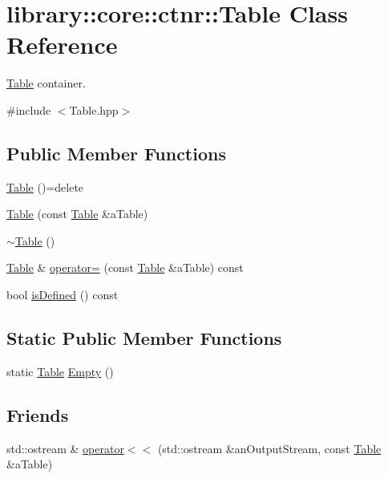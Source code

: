 \hypertarget{classlibrary_1_1core_1_1ctnr_1_1Table}{}\section{library\+:\+:core\+:\+:ctnr\+:\+:Table Class Reference}
\label{classlibrary_1_1core_1_1ctnr_1_1Table}


\hyperlink{classlibrary_1_1core_1_1ctnr_1_1Table}{Table} container.  




{\ttfamily \#include $<$Table.\+hpp$>$}

\subsection*{Public Member Functions}
\begin{DoxyCompactItemize}
\item 
\hyperlink{classlibrary_1_1core_1_1ctnr_1_1Table_a5c88870b3e09883ccaa6e58f26de6b02}{Table} ()=delete
\item 
\hyperlink{classlibrary_1_1core_1_1ctnr_1_1Table_afaaf450a1a4949b48b6290460137921e}{Table} (const \hyperlink{classlibrary_1_1core_1_1ctnr_1_1Table}{Table} \&a\+Table)
\item 
\hyperlink{classlibrary_1_1core_1_1ctnr_1_1Table_a8cdd20d9cd30399a4611b0b8cd2894d5}{$\sim$\+Table} ()
\item 
\hyperlink{classlibrary_1_1core_1_1ctnr_1_1Table}{Table} \& \hyperlink{classlibrary_1_1core_1_1ctnr_1_1Table_af1d446ec74df66da7bd1eb3ff2d6bb55}{operator=} (const \hyperlink{classlibrary_1_1core_1_1ctnr_1_1Table}{Table} \&a\+Table) const
\item 
bool \hyperlink{classlibrary_1_1core_1_1ctnr_1_1Table_af2777d4233cd7caa7cc81b3b957c3a0c}{is\+Defined} () const
\end{DoxyCompactItemize}
\subsection*{Static Public Member Functions}
\begin{DoxyCompactItemize}
\item 
static \hyperlink{classlibrary_1_1core_1_1ctnr_1_1Table}{Table} \hyperlink{classlibrary_1_1core_1_1ctnr_1_1Table_a75089c496f8aac71e374616d55a78e03}{Empty} ()
\end{DoxyCompactItemize}
\subsection*{Friends}
\begin{DoxyCompactItemize}
\item 
std\+::ostream \& \hyperlink{classlibrary_1_1core_1_1ctnr_1_1Table_afaece709b2f143e4011941ae67b7adba}{operator$<$$<$} (std\+::ostream \&an\+Output\+Stream, const \hyperlink{classlibrary_1_1core_1_1ctnr_1_1Table}{Table} \&a\+Table)
\end{DoxyCompactItemize}


